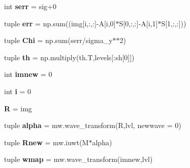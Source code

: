 \begin{DoxyCompactItemize}
\item 
\hypertarget{namespace_m2_c_a_d_1_1_m_c_a_a0dfb357d90d37dfc9f1359460fac09d3}{}int {\bfseries serr} = sig+0\label{namespace_m2_c_a_d_1_1_m_c_a_a0dfb357d90d37dfc9f1359460fac09d3}

\item 
\hypertarget{namespace_m2_c_a_d_1_1_m_c_a_aa682e1d690ae66dc73aed8817ce2d381}{}tuple {\bfseries err} = np.\+sum((img\mbox{[}i,\+:,\+:\mbox{]}-\/A\mbox{[}i,0\mbox{]}$\ast$S\mbox{[}0,\+:,\+:\mbox{]}-\/A\mbox{[}i,1\mbox{]}$\ast$S\mbox{[}1,\+:,\+:\mbox{]}))\label{namespace_m2_c_a_d_1_1_m_c_a_aa682e1d690ae66dc73aed8817ce2d381}

\item 
\hypertarget{namespace_m2_c_a_d_1_1_m_c_a_a369c4c9067389a4d5f17c1f7b7863360}{}tuple {\bfseries Chi} = np.\+sum(serr/sigma\+\_\+y$\ast$$\ast$2)\label{namespace_m2_c_a_d_1_1_m_c_a_a369c4c9067389a4d5f17c1f7b7863360}

\item 
\hypertarget{namespace_m2_c_a_d_1_1_m_c_a_ad8b3b442521788f398aee375a7f54b21}{}tuple {\bfseries th} = np.\+multiply(th.\+T,levels\mbox{[}\+:sh\mbox{[}0\mbox{]}\mbox{]})\label{namespace_m2_c_a_d_1_1_m_c_a_ad8b3b442521788f398aee375a7f54b21}

\item 
\hypertarget{namespace_m2_c_a_d_1_1_m_c_a_aca21a8660fc6c559fdec975eab086930}{}int {\bfseries imnew} = 0\label{namespace_m2_c_a_d_1_1_m_c_a_aca21a8660fc6c559fdec975eab086930}

\item 
\hypertarget{namespace_m2_c_a_d_1_1_m_c_a_acb559820d9ca11295b4500f179ef6392}{}int {\bfseries i} = 0\label{namespace_m2_c_a_d_1_1_m_c_a_acb559820d9ca11295b4500f179ef6392}

\item 
\hypertarget{namespace_m2_c_a_d_1_1_m_c_a_acb95449a94688af33f6e9bb090cf2936}{}{\bfseries R} = img\label{namespace_m2_c_a_d_1_1_m_c_a_acb95449a94688af33f6e9bb090cf2936}

\item 
\hypertarget{namespace_m2_c_a_d_1_1_m_c_a_a78c13eb9dcf07c8b61522f27f21e5297}{}tuple {\bfseries alpha} = mw.\+wave\+\_\+transform(R,lvl, newwave = 0)\label{namespace_m2_c_a_d_1_1_m_c_a_a78c13eb9dcf07c8b61522f27f21e5297}

\item 
\hypertarget{namespace_m2_c_a_d_1_1_m_c_a_a552bc71982c0deaa403a04296b4be4b8}{}tuple {\bfseries Rnew} = mw.\+iuwt(M$\ast$alpha)\label{namespace_m2_c_a_d_1_1_m_c_a_a552bc71982c0deaa403a04296b4be4b8}

\item 
\hypertarget{namespace_m2_c_a_d_1_1_m_c_a_ae1e6dd94df9792605d1bc99dbf311922}{}tuple {\bfseries wmap} = mw.\+wave\+\_\+transform(imnew,lvl)\label{namespace_m2_c_a_d_1_1_m_c_a_ae1e6dd94df9792605d1bc99dbf311922}

\end{DoxyCompactItemize}



